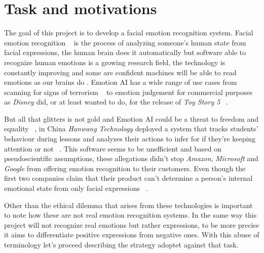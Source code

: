 \section{Task and motivations}
The goal of this project is to develop a facial emotion recognition system.
Facial emotion recognition ~\cite{blog:facial_recognition} is the process of analyzing someone's human state from facial expressions, the human brain does it automatically but software able to recognize human emotions is a growing research field, the technology is constantly improving and some are confident machines will be able to read emotions as our brains do .
Emotion AI has a wide range of use cases from scanning for signs of terrorism ~\cite{blog:terrorism} to emotion judgement for commercial purposes as \textit{Disney} did, or at least wanted to do, for the release of \textit{Toy Story 5} ~\cite{blog:disney}.

But all that glitters is not gold and Emotion AI could be a threat to freedom and equality ~\cite{blog:china1}, in China \textit{Hanwang Technology} deployed a system that tracks students' behaviour during lessons and analyzes their actions to infer for if they're keeping attention or not ~\cite{blog:china3}.
This software seems to be unefficient and based on pseudoscientific assumptions,  these allegations didn't stop \textit{Amazon}, \textit{Microsoft} and \textit{Google} from offering emotion recognition to their customers. 
Even though the first two companies claim that their product can't determine a person's internal emotional state from only facial expressions ~\cite{blog:china2}. 

Other than the ethical dilemma that arises from these technologies is important to note how these are not real emotion recognition systems.
In the same way this project will not recognize real emotions but rather expressions, to be more precise it aims to differentiate positive expressions from negative ones.
With this abuse of terminology let's proceed describing the strategy adoptet against that task.